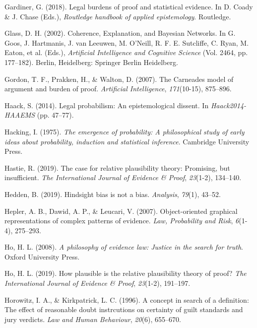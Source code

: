 \documentclass[11pt,dvipsnames,enabledeprecatedfontcommands]{scrartcl}
\begin{document}
\leavevmode\hypertarget{ref-gardiner2018}{}%
Gardiner, G. (2018). Legal burdens of proof and statistical evidence. In
D. Coady \& J. Chase (Eds.), \emph{Routledge handbook of applied
epistemology}. Routledge.

\leavevmode\hypertarget{ref-glass2002}{}%
Glass, D. H. (2002). Coherence, Explanation, and Bayesian Networks. In
G. Goos, J. Hartmanis, J. van Leeuwen, M. O'Neill, R. F. E. Sutcliffe,
C. Ryan, M. Eaton, et al. (Eds.), \emph{Artificial Intelligence and
Cognitive Science} (Vol. 2464, pp. 177--182). Berlin, Heidelberg:
Springer Berlin Heidelberg.

\leavevmode\hypertarget{ref-gordon2007}{}%
Gordon, T. F., Prakken, H., \& Walton, D. (2007). The Carneades model of
argument and burden of proof. \emph{Artificial Intelligence},
\emph{171}(10-15), 875--896.

\leavevmode\hypertarget{ref-haack2011legal}{}%
Haack, S. (2014). Legal probabilism: An epistemological dissent. In
\emph{Haack2014-HAAEMS} (pp. 47--77).

\leavevmode\hypertarget{ref-Hacking1984}{}%
Hacking, I. (1975). \emph{The emergence of probability: A philosophical
study of early ideas about probability, induction and statistical
inference}. Cambridge University Press.

\leavevmode\hypertarget{ref-hastie2019CaseRelativePlausibilitya}{}%
Hastie, R. (2019). The case for relative plausibility theory: Promising,
but insufficient. \emph{The International Journal of Evidence \& Proof},
\emph{23}(1-2), 134--140.

\leavevmode\hypertarget{ref-hedden2019}{}%
Hedden, B. (2019). Hindsight bias is not a bias. \emph{Analysis},
\emph{79}(1), 43--52.

\leavevmode\hypertarget{ref-hepler2007ObjectorientedGraphicalRepresentations}{}%
Hepler, A. B., Dawid, A. P., \& Leucari, V. (2007). Object-oriented
graphical representations of complex patterns of evidence. \emph{Law,
Probability and Risk}, \emph{6}(1-4), 275--293.

\leavevmode\hypertarget{ref-ho2008philosophy}{}%
Ho, H. L. (2008). \emph{A philosophy of evidence law: Justice in the
search for truth}. Oxford University Press.

\leavevmode\hypertarget{ref-lai2019HowPlausibleRelative}{}%
Ho, H. L. (2019). How plausible is the relative plausibility theory of
proof? \emph{The International Journal of Evidence \& Proof},
\emph{23}(1-2), 191--197.

\leavevmode\hypertarget{ref-Horowitz1996}{}%
Horowitz, I. A., \& Kirkpatrick, L. C. (1996). A concept in search of a
definition: The effect of reasonable doubt instrcutions on certainty of
guilt standards and jury verdicts. \emph{Law and Human Behaviour},
\emph{20}(6), 655--670.
\end{document}
